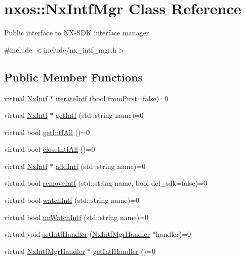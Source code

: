 \hypertarget{classnxos_1_1_nx_intf_mgr}{}\section{nxos\+:\+:Nx\+Intf\+Mgr Class Reference}
\label{classnxos_1_1_nx_intf_mgr}


Public interface to N\+X-\/\+S\+DK interface manager.  




{\ttfamily \#include $<$include/nx\+\_\+intf\+\_\+mgr.\+h$>$}

\subsection*{Public Member Functions}
\begin{DoxyCompactItemize}
\item 
virtual \mbox{\hyperlink{classnxos_1_1_nx_intf}{Nx\+Intf}} $\ast$ \mbox{\hyperlink{classnxos_1_1_nx_intf_mgr_acbe3d94cba5b7982d80cc498d7fcbdf7}{iterate\+Intf}} (bool from\+First=false)=0
\item 
virtual \mbox{\hyperlink{classnxos_1_1_nx_intf}{Nx\+Intf}} $\ast$ \mbox{\hyperlink{classnxos_1_1_nx_intf_mgr_a1271144b1921be0dcb27a6aa7310bbc5}{get\+Intf}} (std\+::string name)=0
\item 
virtual bool \mbox{\hyperlink{classnxos_1_1_nx_intf_mgr_af70ee700e633a9f5ae35608d7637ee04}{get\+Intf\+All}} ()=0
\item 
virtual bool \mbox{\hyperlink{classnxos_1_1_nx_intf_mgr_a45e7cb2a8e3919667c14264dd618168a}{close\+Intf\+All}} ()=0
\item 
virtual \mbox{\hyperlink{classnxos_1_1_nx_intf}{Nx\+Intf}} $\ast$ \mbox{\hyperlink{classnxos_1_1_nx_intf_mgr_a818e4d019413e8111cbb9610e465f714}{add\+Intf}} (std\+::string name)=0
\item 
virtual bool \mbox{\hyperlink{classnxos_1_1_nx_intf_mgr_a89ab4d3bcc05b6c2d938ebd969454306}{remove\+Intf}} (std\+::string name, bool del\+\_\+sdk=false)=0
\item 
virtual bool \mbox{\hyperlink{classnxos_1_1_nx_intf_mgr_aa07fd4d582d52a9aac7a2efd88675bfc}{watch\+Intf}} (std\+::string name)=0
\item 
virtual bool \mbox{\hyperlink{classnxos_1_1_nx_intf_mgr_a325eed4d08efc01fca1993148911a21a}{un\+Watch\+Intf}} (std\+::string name)=0
\item 
virtual void \mbox{\hyperlink{classnxos_1_1_nx_intf_mgr_a9a8927131c8edd906ff035a2bbbe0eb0}{set\+Intf\+Handler}} (\mbox{\hyperlink{classnxos_1_1_nx_intf_mgr_handler}{Nx\+Intf\+Mgr\+Handler}} $\ast$handler)=0
\item 
virtual \mbox{\hyperlink{classnxos_1_1_nx_intf_mgr_handler}{Nx\+Intf\+Mgr\+Handler}} $\ast$ \mbox{\hyperlink{classnxos_1_1_nx_intf_mgr_af3fff8d1738bc43b2441a8b868984665}{get\+Intf\+Handler}} ()=0
\end{DoxyCompactItemize}


